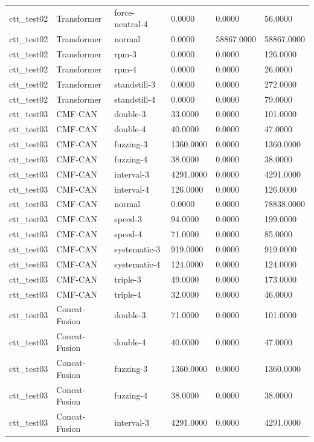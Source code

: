 \begin{tabular}{llllll}
ctt_test02 & Transformer & force-neutral-4 & 0.0000 & 0.0000 & 56.0000 \\
ctt_test02 & Transformer & normal & 0.0000 & 58867.0000 & 58867.0000 \\
ctt_test02 & Transformer & rpm-3 & 0.0000 & 0.0000 & 126.0000 \\
ctt_test02 & Transformer & rpm-4 & 0.0000 & 0.0000 & 26.0000 \\
ctt_test02 & Transformer & standstill-3 & 0.0000 & 0.0000 & 272.0000 \\
ctt_test02 & Transformer & standstill-4 & 0.0000 & 0.0000 & 79.0000 \\
ctt_test03 & CMF-CAN & double-3 & 33.0000 & 0.0000 & 101.0000 \\
ctt_test03 & CMF-CAN & double-4 & 40.0000 & 0.0000 & 47.0000 \\
ctt_test03 & CMF-CAN & fuzzing-3 & 1360.0000 & 0.0000 & 1360.0000 \\
ctt_test03 & CMF-CAN & fuzzing-4 & 38.0000 & 0.0000 & 38.0000 \\
ctt_test03 & CMF-CAN & interval-3 & 4291.0000 & 0.0000 & 4291.0000 \\
ctt_test03 & CMF-CAN & interval-4 & 126.0000 & 0.0000 & 126.0000 \\
ctt_test03 & CMF-CAN & normal & 0.0000 & 0.0000 & 78838.0000 \\
ctt_test03 & CMF-CAN & speed-3 & 94.0000 & 0.0000 & 199.0000 \\
ctt_test03 & CMF-CAN & speed-4 & 71.0000 & 0.0000 & 85.0000 \\
ctt_test03 & CMF-CAN & systematic-3 & 919.0000 & 0.0000 & 919.0000 \\
ctt_test03 & CMF-CAN & systematic-4 & 124.0000 & 0.0000 & 124.0000 \\
ctt_test03 & CMF-CAN & triple-3 & 49.0000 & 0.0000 & 173.0000 \\
ctt_test03 & CMF-CAN & triple-4 & 32.0000 & 0.0000 & 46.0000 \\
ctt_test03 & Concat-Fusion & double-3 & 71.0000 & 0.0000 & 101.0000 \\
ctt_test03 & Concat-Fusion & double-4 & 40.0000 & 0.0000 & 47.0000 \\
ctt_test03 & Concat-Fusion & fuzzing-3 & 1360.0000 & 0.0000 & 1360.0000 \\
ctt_test03 & Concat-Fusion & fuzzing-4 & 38.0000 & 0.0000 & 38.0000 \\
ctt_test03 & Concat-Fusion & interval-3 & 4291.0000 & 0.0000 & 4291.0000 \\

\end{tabular}
